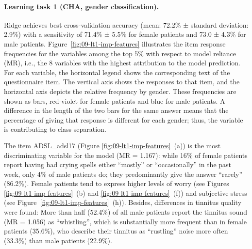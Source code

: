 \documentclass[
  oneside]{book}
\begin{document}
\paragraph*{Learning task 1 (CHA, gender classification).}

Ridge achieves best cross-validation accuracy (mean: 72.2\% ± standard deviation: 2.9\%) with a sensitivity of 71.4\% ± 5.5\% for female patients and 73.0 ± 4.3\% for male patients.
Figure~\ref{fig:09-lt1-imp-features} illustrates the item response frequencies for the variables among the top 5\% with respect to model reliance (MR), i.e., the 8 variables with the highest attribution to the model prediction.
For each variable, the horizontal legend shows the corresponding text of the questionnaire item.
The vertical axis shows the responses to that item, and the horizontal axis depicts the relative frequency by gender.
These frequencies are shown as bars, red-violet for female patients and blue for male patients.
A difference in the length of the two bars for the same answer means that the percentage of giving that response is different for each gender; thus, the variable is contributing to class separation.

The item ADSL\_adsl17 (Figure \ref{fig:09-lt1-imp-features}~(a)) is the most discriminating variable for the model (MR = 1.167): while 16\% of female patients report having had crying spells either ``mostly'' or ``occasionally'' in the past week, only 4\% of male patients do; they predominantly give the answer ``rarely'' (86.2\%).
Female patients tend to express higher levels of worry (see Figures \ref{fig:09-lt1-imp-features}~(b) and \ref{fig:09-lt1-imp-features}~(f)) and subjective stress (see Figure~\ref{fig:09-lt1-imp-features}~(h)).
Besides, differences in tinnitus quality were found: More than half (52.4\%) of all male patients report the tinnitus sound (MR = 1.056) as ``whistling'', which is substantially more frequent than in female patients (35.6\%), who describe their tinnitus as ``rustling'' noise more often (33.3\%) than male patients (22.9\%).
\end{document}
